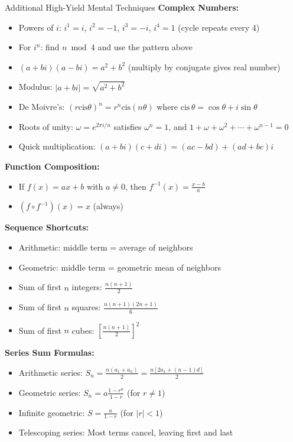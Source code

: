 \documentclass{article}
\begin{document}
\begin{mentalbox}{Additional High-Yield Mental Techniques}
\textbf{Complex Numbers:} 
\begin{itemize}[nosep]
\item Powers of $i$: $i^1=i$, $i^2=-1$, $i^3=-i$, $i^4=1$ (cycle repeats every 4)
\item For $i^n$: find $n \bmod 4$ and use the pattern above
\item $(a+bi)(a-bi) = a^2+b^2$ (multiply by conjugate gives real number)
\item Modulus: $|a+bi| = \sqrt{a^2+b^2}$
\item De Moivre's: $(r\text{cis}\theta)^n = r^n\text{cis}(n\theta)$ where $\text{cis}\,\theta=\cos\theta+i\sin\theta$
\item Roots of unity: $\omega = e^{2\pi i/n}$ satisfies $\omega^n = 1$, and $1 + \omega + \omega^2 + \cdots + \omega^{n-1} = 0$
\item Quick multiplication: $(a+bi)(c+di) = (ac-bd) + (ad+bc)i$
\end{itemize}

\textbf{Function Composition:} 
\begin{itemize}[nosep]
\item If $f(x) = ax+b$ with $a\neq0$, then $f^{-1}(x) = \frac{x-b}{a}$
\item $(f \circ f^{-1})(x) = x$ (always)
\end{itemize}

\textbf{Sequence Shortcuts:}
\begin{itemize}[nosep]
\item Arithmetic: middle term = average of neighbors
\item Geometric: middle term = geometric mean of neighbors  
\item Sum of first $n$ integers: $\frac{n(n+1)}{2}$
\item Sum of first $n$ squares: $\frac{n(n+1)(2n+1)}{6}$
\item Sum of first $n$ cubes: $[\frac{n(n+1)}{2}]^2$
\end{itemize}

\textbf{Series Sum Formulas:}
\begin{itemize}[nosep]
\item Arithmetic series: $S_n = \frac{n(a_1 + a_n)}{2} = \frac{n[2a_1 + (n-1)d]}{2}$
\item Geometric series: $S_n = a\frac{1-r^n}{1-r}$ (for $r \neq 1$)
\item Infinite geometric: $S = \frac{a}{1-r}$ (for $|r| < 1$)
\item Telescoping series: Most terms cancel, leaving first and last
\end{itemize}


\end{mentalbox}
\end{document}
